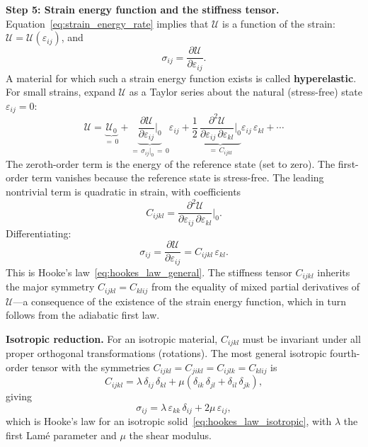 \documentclass[11pt]{article}
\begin{document}
\medskip
\noindent\textbf{Step 5: Strain energy function and the stiffness tensor.}  Equation~\eqref{eq:strain_energy_rate} implies that $\mathcal{U}$ is a function of the strain: $\mathcal{U} = \mathcal{U}(\varepsilon_{ij})$, and
\begin{equation}
  \sigma_{ij} = \frac{\partial \mathcal{U}}{\partial \varepsilon_{ij}}.
  \label{eq:hyperelastic}
\end{equation}
A material for which such a strain energy function exists is called \textbf{hyperelastic}.  For small strains, expand $\mathcal{U}$ as a Taylor series about the natural (stress-free) state $\varepsilon_{ij} = 0$:
\begin{equation}
  \mathcal{U} = \underbrace{\mathcal{U}_0}_{= \,0} + \underbrace{\frac{\partial \mathcal{U}}{\partial \varepsilon_{ij}}\bigg|_0}_{= \,\sigma_{ij}|_0 \,=\, 0}\varepsilon_{ij} + \frac{1}{2}\,\underbrace{\frac{\partial^2 \mathcal{U}}{\partial \varepsilon_{ij}\,\partial \varepsilon_{kl}}\bigg|_0}_{= \,C_{ijkl}}\varepsilon_{ij}\,\varepsilon_{kl} + \cdots
  \label{eq:taylor_expansion}
\end{equation}
The zeroth-order term is the energy of the reference state (set to zero).  The first-order term vanishes because the reference state is stress-free.  The leading nontrivial term is quadratic in strain, with coefficients
\begin{equation}
  C_{ijkl} = \frac{\partial^2 \mathcal{U}}{\partial \varepsilon_{ij}\,\partial \varepsilon_{kl}}\bigg|_0.
  \label{eq:stiffness_definition}
\end{equation}
Differentiating:
\begin{equation}
  \sigma_{ij} = \frac{\partial \mathcal{U}}{\partial \varepsilon_{ij}} = C_{ijkl}\,\varepsilon_{kl}.
\end{equation}
This is Hooke's law~\eqref{eq:hookes_law_general}.  The stiffness tensor $C_{ijkl}$ inherits the major symmetry $C_{ijkl} = C_{klij}$ from the equality of mixed partial derivatives of $\mathcal{U}$---a consequence of the existence of the strain energy function, which in turn follows from the adiabatic first law.

\medskip
\noindent\textbf{Isotropic reduction.}  For an isotropic material, $C_{ijkl}$ must be invariant under all proper orthogonal transformations (rotations).  The most general isotropic fourth-order tensor with the symmetries $C_{ijkl} = C_{jikl} = C_{ijlk} = C_{klij}$ is
\begin{equation}
  C_{ijkl} = \lambda\,\delta_{ij}\,\delta_{kl} + \mu\!\left(\delta_{ik}\,\delta_{jl} + \delta_{il}\,\delta_{jk}\right),
\end{equation}
giving
\begin{equation}
  \sigma_{ij} = \lambda\,\varepsilon_{kk}\,\delta_{ij} + 2\mu\,\varepsilon_{ij},
\end{equation}
which is Hooke's law for an isotropic solid~\eqref{eq:hookes_law_isotropic}, with $\lambda$ the first Lam\'{e} parameter and $\mu$ the shear modulus.
\end{document}
